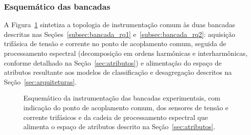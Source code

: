 \documentclass[times,final]{elsarticle}
\begin{document}
\subsubsection{Esquemático das bancadas}
\label{subsec:esquematico}
A Figura~\ref{fig:esquematico} sintetiza a topologia de instrumentação comum às duas bancadas descritas nas Seções~\ref{subsec:bancada_rq1} e~\ref{subsec:bancada_rq2}: aquisição trifásica de tensão e corrente no ponto de acoplamento comum, seguida de processamento espectral (decomposição em ordens harmônicas e interharmônicas, conforme detalhado na Seção~\ref{sec:atributos}) e alimentação do espaço de atributos resultante aos modelos de classificação e desagregação descritos na Seção~\ref{sec:arquiteturas}.
\begin{figure}[htbp]
    \centering
    \caption{Esquemático da instrumentação das bancadas experimentais, com indicação do ponto de acoplamento comum, dos sensores de tensão e corrente trifásicos e da cadeia de processamento espectral que alimenta o espaço de atributos descrito na Seção~\ref{sec:atributos}.}
    \label{fig:esquematico}
\end{figure}
\end{document}
